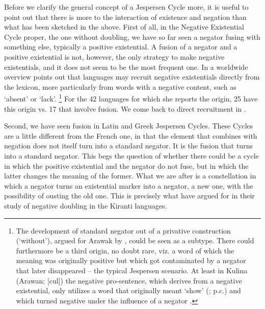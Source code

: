 ﻿\documentclass[output=paper,draft,draftmode,colorlinks,citecolor=brown]{langscibook}
\begin{document}
Before we clarify the general concept of a Jespersen Cycle more, it is
useful to point out that there is more to the interaction of existence and
negation than what has been sketched in the above. First of all, in the
Negative Existential Cycle proper, the one without doubling, we have so far
seen a negator fusing with something else, typically a positive
existential. A fusion of a negator and a positive existential is not,
however, the only strategy to make negative existentials, and it does not
seem to be the most frequent one. In a worldwide overview
\textcite[137]{Veselinova2013} points out that languages may recruit
negative existentials directly from the lexicon, more particularly from
words with a negative content, such as `absent' or `lack'.%
%
\footnote{The
development of standard negator out of a privative construction
(`without'), argued for Arawak by \textcite[285--288]{Michael2014}, could be
seen as a subtype. There could furthermore be a third origin, no doubt
rare, viz. a word of which the meaning was originally positive but which
got contaminated by a negator that later disappeared -- the typical
Jespersen scenario. At least in Kulina (Arawan; [cul]) the negative
pro-sentence, which derives from a negative existential, only utilizes a
word that originally meant `show' (\citealt[236]{Dienst2014}; p.c.) and
which turned negative under the influence of a negator
\parencite{KrasnoukhovaAuweraXXXX}.} %
%
For the 42 languages for which she reports the
origin, 25 have this origin vs. 17 that involve fusion. We come back to
direct recruitment in .

Second, we have seen fusion in Latin and Greek Jespersen Cycles. These
Cycles are a little different from the French one, in that the element that
combines with negation does not itself turn into a standard negator. It is
the fusion that turns into a standard negator. This begs the question of
whether there could be a cycle in which the positive existential and the
negator do not fuse, but in which the latter changes the meaning of the
former. What we are after is a constellation in which a negator turns an
existential marker into a negator, a new one, with the possibility of
ousting the old one. This is precisely what 
\textcite{AuweraVossen2017} have argued for in their study of negative
doubling in the Kiranti languages.
\end{document}
